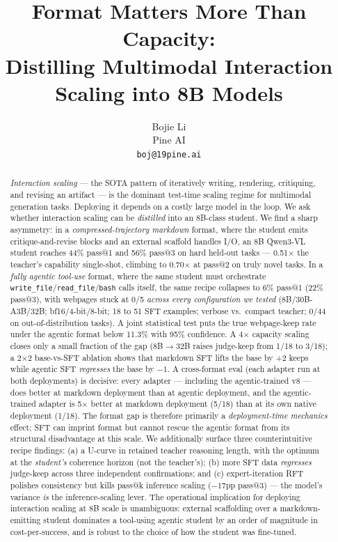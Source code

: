 \documentclass[11pt]{article}
\title{Format Matters More Than Capacity:\texorpdfstring{\\}{ }Distilling Multimodal Interaction Scaling into 8B Models}
\author{
  Bojie Li\\
  Pine AI \\
  \texttt{boj@19pine.ai}
}
\date{}
\begin{document}
\maketitle

\begin{abstract}
\emph{Interaction scaling} --- the SOTA pattern of iteratively writing, rendering, critiquing, and revising an artifact --- is the dominant test-time scaling regime for multimodal generation tasks. Deploying it depends on a costly large model in the loop. We ask whether interaction scaling can be \emph{distilled} into an 8B-class student.
We find a sharp asymmetry: in a \emph{compressed-trajectory markdown} format, where the student emits critique-and-revise blocks and an external scaffold handles I/O, an 8B Qwen3-VL student reaches 44\% pass@1 and 56\% pass@3 on hard held-out tasks --- 0.51$\times$ the teacher's capability single-shot, climbing to 0.70$\times$ at pass@2 on truly novel tasks. In a \emph{fully agentic tool-use} format, where the same student must orchestrate \texttt{write\_file}/\texttt{read\_file}/\texttt{bash} calls itself, the same recipe collapses to 6\% pass@1 (22\% pass@3), with webpages stuck at 0/5 \emph{across every configuration we tested} (8B/30B-A3B/32B; bf16/4-bit/8-bit; 18 to 51 SFT examples; verbose vs.\ compact teacher; 0/44 on out-of-distribution tasks). A joint statistical test puts the true webpage-keep rate under the agentic format below 11.3\% with 95\% confidence.
A 4$\times$ capacity scaling closes only a small fraction of the gap (8B$\to$32B raises judge-keep from 1/18 to 3/18); a 2$\times$2 base-vs-SFT ablation shows that markdown SFT lifts the base by +2 keeps while agentic SFT \emph{regresses} the base by $-1$. A cross-format eval (each adapter run at both deployments) is decisive: every adapter --- including the agentic-trained v8 --- does better at markdown deployment than at agentic deployment, and the agentic-trained adapter is 5$\times$ better at markdown deployment (5/18) than at its own native deployment (1/18). The format gap is therefore primarily a \emph{deployment-time mechanics} effect; SFT can imprint format but cannot rescue the agentic format from its structural disadvantage at this scale.
We additionally surface three counterintuitive recipe findings: (a) a U-curve in retained teacher reasoning length, with the optimum at the \emph{student's} coherence horizon (not the teacher's); (b) more SFT data \emph{regresses} judge-keep across three independent confirmations; and (c) expert-iteration RFT polishes consistency but kills pass@k inference scaling ($-17$pp pass@3) --- the model's variance \emph{is} the inference-scaling lever.
The operational implication for deploying interaction scaling at 8B scale is unambiguous: external scaffolding over a markdown-emitting student dominates a tool-using agentic student by an order of magnitude in cost-per-success, and is robust to the choice of how the student was fine-tuned.
\end{abstract}
\end{document}
